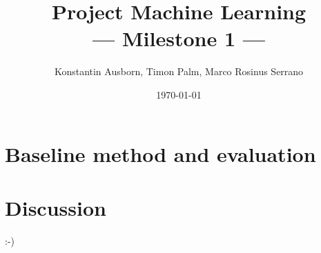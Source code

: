 \documentclass[10pt,a4paper,twoside]{article}
\title{Project Machine Learning\\--- Milestone 1 ---}
\author{Konstantin Ausborn, Timon Palm, Marco Rosinus Serrano}
\date{\today}
\begin{document}
    \maketitle

    \section{Baseline method and evaluation}\label{sec:baseline-method-and-evaluation}
    

    \section{Discussion}
    :-)
    
\end{document}
